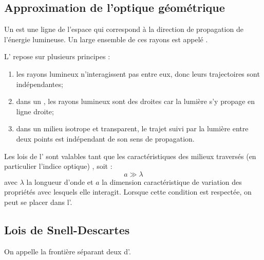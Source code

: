 \subsection{Approximation de l'optique géométrique}

\begin{definition}
Un  est une ligne de l'espace qui correspond à la direction de propagation de l'énergie lumineuse. Un large ensemble de ces rayons est appelé .
\end{definition}

\begin{definition}
L' repose sur plusieurs principes :

\begin{enumerate}[label=\tdef{(\roman*)}]
\item {} les rayons lumineux n'interagissent pas entre eux, donc leurs trajectoires sont indépendantes;
\item {} dans un , les rayons lumineux sont des droites car la lumière s'y propage en ligne droite;
\item {} dans un milieu isotrope et transparent, le trajet suivi par la lumière entre deux points est indépendant de son sens de propagation.
\end{enumerate}
\end{definition}

\begin{propriete}[admis]
Les lois de l' sont valables tant que les caractéristiques des milieux traversés (en particulier l'indice optique) , soit :
\[a \gg \lambda\]
avec $\lambda$ la longueur d'onde et $a$ la dimension caractéristique de variation des propriétés avec lesquels elle interagit. Lorsque cette condition est respectée, on peut se placer dans l'.
\end{propriete}



\subsection{Lois de Snell-Descartes}

\begin{definition}
On appelle  la frontière séparant deux  d'.
\end{definition}

